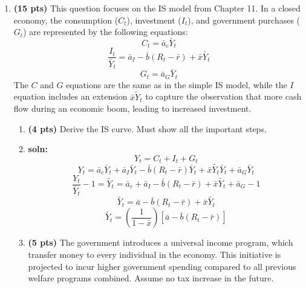 \documentclass[14pt, oneside]{memoir}
\begin{document}
\begin{enumerate}[label=\textbf{\arabic*.}, itemsep=15pt]
\begin{enumerate}[label=(\alph*)]
	\vspace{1cm}
	
	\item[] \textbf{soln:} The interest tax reduces the benefit of saving in the current period, altering the relative price. Consequently, an increase in the tax ($\tau$) would lead to higher current consumption ($c$) and lower future consumption ($c'$). Therefore, removing the interest tax would incentivize consumers to save more, resulting in decreased current consumption ($c$) and increased future consumption ($c'$).
	
\end{enumerate}

\clearpage
\item  \textbf{(15 pts)}\label{P3} This question focuses on the IS model from Chapter 11. In a closed economy, the consumption ($C_t$), investment ($I_t$), and government purchases ($G_t$) are represented by the following equations:
\[C_t = \bar{a}_c \bar{Y}_t\]
\[\frac{I_t}{\bar{Y}_t} = \bar{a}_I  - \bar{b} \left(R_t - \bar{r}\right) + \bar{x} \widetilde{Y_t}\]
\[G_t = \bar{a}_G \bar{Y}_t \]
The $C$ and $G$ equations are the same as in the simple IS model, while the $I$ equation includes an extension $\bar{x}\widetilde{Y}_t$ to capture the observation that more cash flow during an economic boom, leading to increased investment.


\begin{enumerate}[label=(\alph*)]
	\item \textbf{(4 pts)} Derive the IS curve. Must show all the important steps.
	
	\item[] \textbf{soln:} 
	\[Y_t = C_t + I_t + G_t \]
	\[Y_t = \bar{a}_c \bar{Y}_t + \bar{a}_I \bar{Y}_t  - \bar{b} \left(R_t - \bar{r}\right) \bar{Y}_t + \bar{x} \widetilde{Y_t} \bar{Y}_t + \bar{a}_G \bar{Y}_t \] 
	\[\frac{Y_t}{\bar{Y}_t}-1 =\widetilde{Y_t} = \bar{a}_c + \bar{a}_I  - \bar{b} \left(R_t - \bar{r}\right)  + \bar{x} \widetilde{Y_t} + \bar{a}_G -1 \] 
	\[\widetilde{Y_t} = \bar{a} - \bar{b} \left(R_t - \bar{r}\right)  + \bar{x} \widetilde{Y_t}   \] 
	\[\widetilde{Y_t} = \left(\frac{1}{1-\bar{x}}\right)\left[\bar{a} - \bar{b} \left(R_t - \bar{r}\right) \right]  \]
	\vspace{1cm}
	
	\clearpage
	\item \textbf{(5 pts)} The government introduces a universal income program, which transfer money to every individual in the economy. This initiative is projected to incur higher government spending compared to all previous welfare programs combined. Assume no tax increase in the future. 
	

\end{enumerate}
\end{enumerate}
\end{document}
